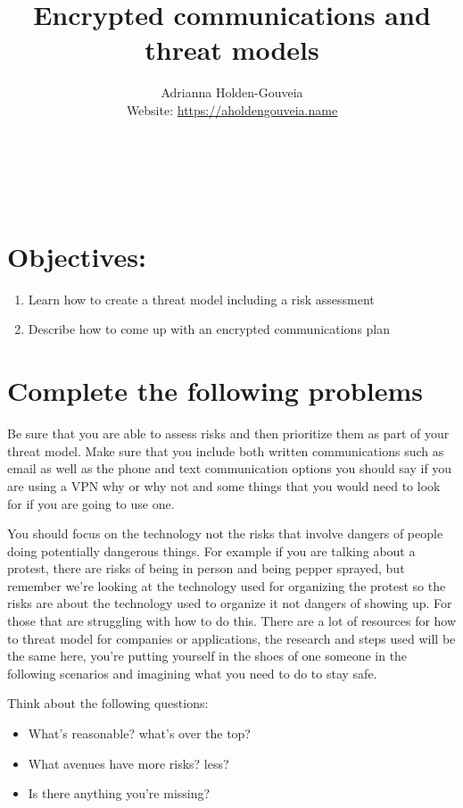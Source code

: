 \documentclass[12pt]{article}
\title{Encrypted communications and threat models}
\author{
        Adrianna Holden-Gouveia \\
        Website: \url{https://aholdengouveia.name}\\ 
        \date{\vspace{-5ex}}
        \faLinkedin{: aholdengouveia} \\
        \faGithub {: aholdengouveia} \\
        \faTwitter {: aholdengouveia} \\
        }
\begin{document}
    

\maketitle


 

\section*{Objectives:}
\begin{enumerate}
    \item Learn how to create a threat model including a risk assessment
    \item Describe how to come up with an encrypted communications plan
\end{enumerate}
\section*{Complete the following problems}


Be sure that you are able to assess risks and then prioritize them as part of your threat model. Make sure that you include both written communications such as email as well as the phone and text communication options you should say if you are using a VPN why or why not and some things that you would need to look for if you are going to use one.

You should focus on the technology not the risks that involve dangers of people doing potentially dangerous things.  For example if you are talking about a protest, there are risks of being in person and being pepper sprayed, but remember we're looking at the technology used for organizing the protest so the risks are about the technology used to organize it not dangers of showing up.
For those that are struggling with how to do this. There are a lot of resources for how to threat model for companies or applications, the research and steps used will be the same here, you're putting yourself in the shoes of one someone in the following scenarios and imagining what you need to do to stay safe. 

Think about the following questions:
\begin{itemize}
    \item What's reasonable? what's over the top?
    \item What avenues have more risks? less?
    \item Is there anything you're missing?
\end{itemize}         
\end{document}
